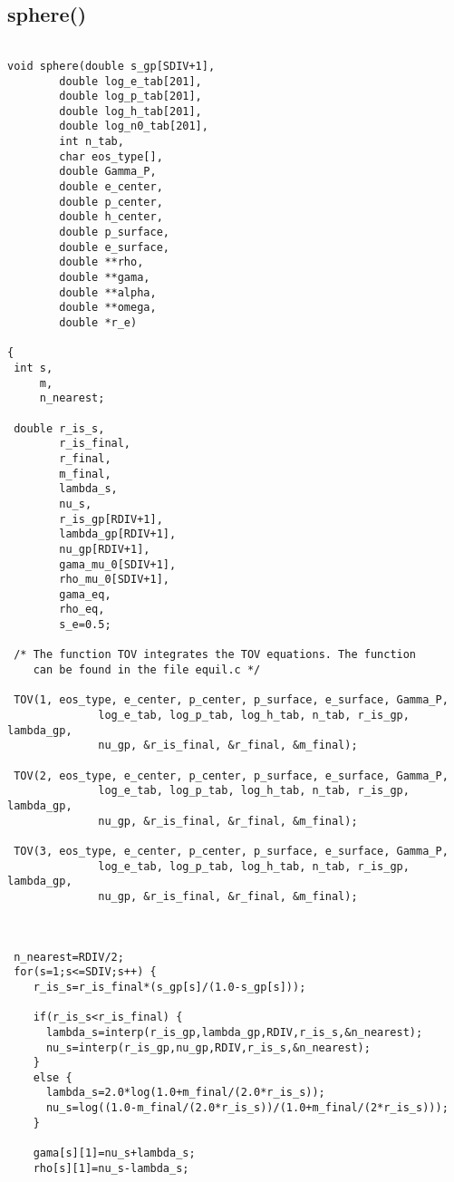 \subsection{sphere()}

\begin{verbatim}

void sphere(double s_gp[SDIV+1], 
	    double log_e_tab[201], 
	    double log_p_tab[201], 
	    double log_h_tab[201],
	    double log_n0_tab[201], 
	    int n_tab,                 
	    char eos_type[],
	    double Gamma_P, 
	    double e_center,
	    double p_center, 
	    double h_center,
	    double p_surface,
	    double e_surface,
	    double **rho,
	    double **gama,
	    double **alpha,
	    double **omega,
	    double *r_e)

{
 int s,
     m,
     n_nearest;

 double r_is_s,
        r_is_final,
        r_final, 
        m_final,
        lambda_s,
        nu_s,
        r_is_gp[RDIV+1],
        lambda_gp[RDIV+1],
        nu_gp[RDIV+1],
        gama_mu_0[SDIV+1],
        rho_mu_0[SDIV+1],
        gama_eq,
        rho_eq,
        s_e=0.5;

 /* The function TOV integrates the TOV equations. The function
	can be found in the file equil.c */

 TOV(1, eos_type, e_center, p_center, p_surface, e_surface, Gamma_P,
              log_e_tab, log_p_tab, log_h_tab, n_tab, r_is_gp, lambda_gp, 
              nu_gp, &r_is_final, &r_final, &m_final);

 TOV(2, eos_type, e_center, p_center, p_surface, e_surface, Gamma_P,
              log_e_tab, log_p_tab, log_h_tab, n_tab, r_is_gp, lambda_gp, 
              nu_gp, &r_is_final, &r_final, &m_final);

 TOV(3, eos_type, e_center, p_center, p_surface, e_surface, Gamma_P,
              log_e_tab, log_p_tab, log_h_tab, n_tab, r_is_gp, lambda_gp, 
              nu_gp, &r_is_final, &r_final, &m_final);



 n_nearest=RDIV/2;
 for(s=1;s<=SDIV;s++) {
    r_is_s=r_is_final*(s_gp[s]/(1.0-s_gp[s]));

    if(r_is_s<r_is_final) {
      lambda_s=interp(r_is_gp,lambda_gp,RDIV,r_is_s,&n_nearest);
      nu_s=interp(r_is_gp,nu_gp,RDIV,r_is_s,&n_nearest);
    }
    else {
      lambda_s=2.0*log(1.0+m_final/(2.0*r_is_s));
      nu_s=log((1.0-m_final/(2.0*r_is_s))/(1.0+m_final/(2*r_is_s)));
    }

    gama[s][1]=nu_s+lambda_s;
    rho[s][1]=nu_s-lambda_s;


\end{verbatim}

